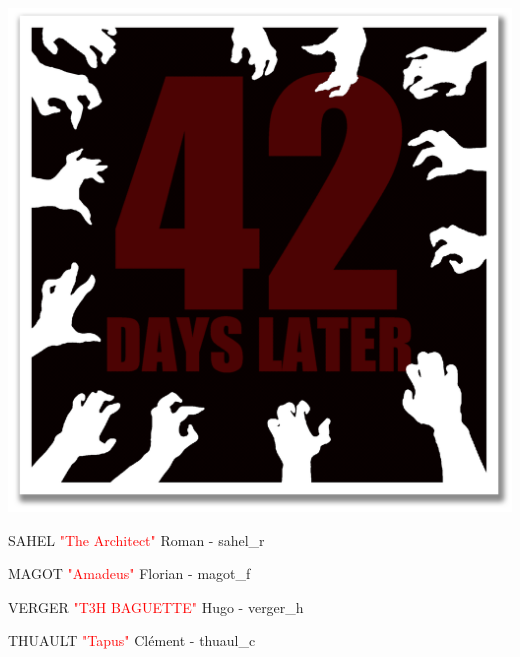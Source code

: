 \documentclass{article}
\begin{document}
\thispagestyle{empty}
\begin{center}
\end{center}

\begin{center}
\end{center}

\vspace*{0.5cm}

\begin{center}
\includegraphics[scale=0.1]{Logo}
\end{center}

\vspace*{0.5cm}

\fontsize{14}{14}
\begin{center}
{SAHEL
\textcolor{red}{"The Architect"}
Roman - sahel\_r}
\end{center}
\begin{center}
MAGOT \textcolor{red}{"Amadeus"} Florian - magot\_f
\end{center}
\begin{center}
VERGER \textcolor{red}{"T3H BAGUETTE"} Hugo - verger\_h
\end{center}
\begin{center}
THUAULT \textcolor{red}{"Tapus"} Clément - thuaul\_c
\end{center}
\end{document}
